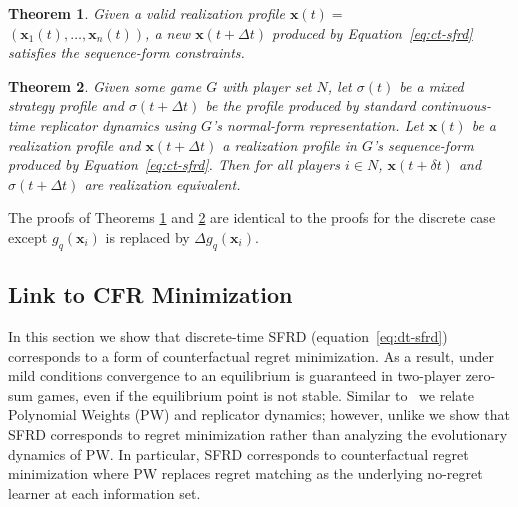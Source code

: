 \documentclass{aamas2014}
\newcommand{\bx}{\mathbf{x}}
\newtheorem{theorem}{Theorem}
\begin{document}
\begin{theorem}
\label{thm:ct-constraints}
Given a valid realization profile $\bx(t) = $\\ $(\bx_1(t), \ldots, \bx_n(t))$, a new $\bx(t + \Delta t)$ produced by
Equation~\ref{eq:ct-sfrd} satisfies the sequence-form constraints. 
\end{theorem}

\begin{theorem}
\label{thm:ct-releq}
Given some game $G$ with player set $N$, 
let $\sigma(t)$ be a mixed strategy profile and $\sigma(t + \Delta t)$ be the profile produced by 
standard continuous-time replicator dynamics using $G$'s normal-form representation. 
Let $\bx(t)$ be a realization profile and $\bx(t + \Delta t)$ a realization profile in $G$'s sequence-form produced by 
Equation~\ref{eq:ct-sfrd}. Then for all players $i \in N$, $\bx(t+\delta t)$ and $\sigma(t + \Delta t)$ are realization equivalent.
\end{theorem}

The proofs of Theorems \ref{thm:ct-constraints} and \ref{thm:ct-releq} are identical to the proofs for the discrete case 
except $g_q(\bx_i)$ is replaced by $\Delta g_q(\bx_i)$.

\subsection{Link to CFR Minimization}

In this section we show that discrete-time SFRD (equation~\ref{eq:dt-sfrd}) corresponds to a form of counterfactual 
regret minimization. As a result, under mild conditions convergence to an equilibrium is guaranteed 
in two-player zero-sum games, even if the equilibrium point is not stable. 
Similar to~\cite{Klos10Evolutionary} we relate Polynomial Weights (PW) and replicator dynamics; 
however, unlike \cite{Klos10Evolutionary} we show that SFRD corresponds to regret minimization rather than analyzing the 
evolutionary dynamics of PW. 
In particular, SFRD corresponds to counterfactual regret minimization where PW replaces 
regret matching as the underlying no-regret learner at each information set. 
\end{document}
